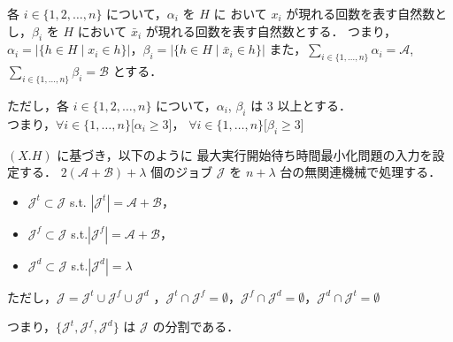 \documentclass[12pt]{optlab-bachelor}
\begin{document}
各 $i \in \{1,2,\ldots, n\}$ について，$\alpha_i$ を $H$ に おいて $x_i$ が現れる回数を表す自然数とし，$\beta_i$ を $H$ において $\bar x_i$ が現れる回数を表す自然数とする．
つまり，$\alpha_i = \big|\{h \in H \mid x_i \in h\}\big|$，$\beta_i = \big|\{h \in H \mid \bar x_i \in h\}\big|$
また，$\displaystyle \sum_{i \in \{1,\ldots,n\}} \alpha_i = \mathcal{A}$, $\displaystyle \sum_{i \in \{1,\ldots,n\}} \beta_i = \mathcal{B}$  とする．

ただし，各 $i \in \{1,2,\ldots, n\}$ について，$\alpha_i$, $\beta_i$ は 3 以上とする．\\
つまり，$\forall i \in \{1,\ldots,n\}\big[\alpha_i \ge 3\big]$，
$\forall i \in \{1,\ldots,n\}\big[\beta_i \ge 3\big]$

$(X.H)$ に基づき，以下のように 最大実行開始待ち時間最小化問題の入力を設定する．
$2(\mathcal{A} + \mathcal{B}) + \lambda$ 個のジョブ $\mathcal{J}$ を
$n + \lambda$ 台の無関連機械で処理する．
\begin{itemize}
  \item $\mathcal{J}^t \subset \mathcal{J}$ s.t. $|\mathcal{J}^t| =
  \mathcal{A}  + \mathcal{B}$，
  \item $\mathcal{J}^f \subset \mathcal{J}$
  s.t.$|\mathcal{J}^f| = \mathcal{A}  + \mathcal{B}$，
  \item $\mathcal{J}^d \subset \mathcal{J}$ s.t.$|\mathcal{J}^d| =
  \lambda$
\end{itemize}
ただし，$\mathcal{J} = \mathcal{J}^t \cup \mathcal{J}^f \cup
\mathcal{J}^d$ ，$\mathcal{J}^t \cap \mathcal{J}^f = \emptyset$，$\mathcal{J}^f \cap \mathcal{J}^d = \emptyset$，$\mathcal{J}^d \cap \mathcal{J}^t = \emptyset$

つまり，$\{\mathcal{J}^t, \mathcal{J}^f,\mathcal{J}^d\}$ は $\mathcal{J}$ の分割である．
\end{document}
